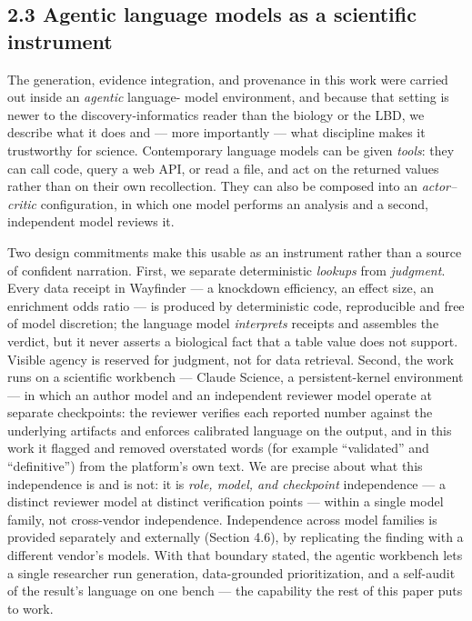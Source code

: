\subsection*{2.3 Agentic language models as a scientific instrument}\label{agentic-language-models-as-a-scientific-instrument}

The generation, evidence integration, and provenance in this work were carried out inside an \emph{agentic} language-
model environment, and because that setting is newer to the discovery-informatics reader than the biology
or the LBD, we describe what it does and --- more importantly --- what discipline makes it trustworthy for
science. Contemporary language models can be given \emph{tools}: they can call code, query a web API, or read a
file, and act on the returned values rather than on their own recollection. They can also be composed into
an \emph{actor--critic} configuration, in which one model performs an analysis and a second, independent model
reviews it.

Two design commitments make this usable as an instrument rather than a source of confident narration.
First, we separate deterministic \emph{lookups} from \emph{judgment}. Every data receipt in Wayfinder --- a knockdown
efficiency, an effect size, an enrichment odds ratio --- is produced by deterministic code, reproducible and
free of model discretion; the language model \emph{interprets} receipts and assembles the verdict, but it never
asserts a biological fact that a table value does not support. Visible agency is reserved for judgment, not
for data retrieval. Second, the work runs on a scientific workbench --- Claude Science, a persistent-kernel
environment --- in which an author model and an independent reviewer model operate at separate checkpoints:
the reviewer verifies each reported number against the underlying artifacts and enforces calibrated
language on the output, and in this work it flagged and removed overstated words (for example ``validated''
and ``definitive'') from the platform's own text. We are precise about what this independence is and is not:
it is \emph{role, model, and checkpoint} independence --- a distinct reviewer model at distinct verification
points --- within a single model family, not cross-vendor independence. Independence across model families
is provided separately and externally (Section 4.6), by replicating the finding with a different vendor's
models. With that boundary stated, the agentic workbench lets a single researcher run generation,
data-grounded prioritization, and a self-audit of the result's language on one bench --- the capability the
rest of this paper puts to work.

